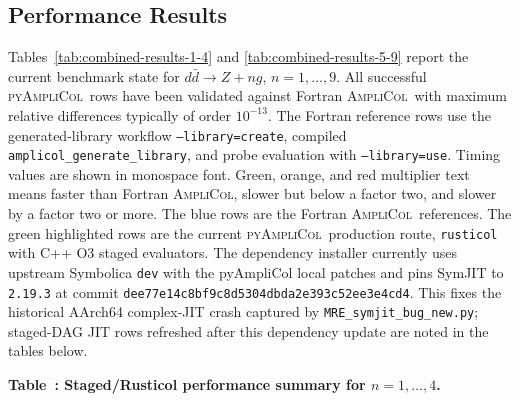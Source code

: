 \documentclass[10pt]{article}
\newcommand{\AC}{\textsc{AmpliCol}}
\newcommand{\PAC}{\textsc{pyAmpliCol}}
\begin{document}
\begin{landscape}
\section{Performance Results}

Tables~\ref{tab:combined-results-1-4} and
\ref{tab:combined-results-5-9}
report the current benchmark state for \(d\bar d\to Z+n g\),
\(n=1,\ldots,9\).  All successful \PAC\ rows have been validated against
Fortran \AC\ with maximum relative differences typically of order \(10^{-13}\).
The Fortran reference rows use the generated-library workflow
\texttt{--library=create}, compiled \texttt{amplicol\_generate\_library}, and
probe evaluation with \texttt{--library=use}.  Timing values are shown in
monospace font.  Green, orange, and red multiplier text means faster than
Fortran \AC, slower but below a factor two, and slower by a factor two or more.
The blue rows are the Fortran \AC\ references.  The green highlighted rows are
the current \PAC\ production route, \texttt{rusticol} with C++ O3 staged
evaluators.
The dependency installer currently uses upstream Symbolica \texttt{dev} with
the pyAmpliCol local patches and pins SymJIT to \texttt{2.19.3} at commit
\texttt{dee77e14c8bf9c8d5304dbda2e393c52ee3e4cd4}.  This fixes the historical
AArch64 complex-JIT crash captured by \texttt{MRE\_symjit\_bug\_new.py};
staged-DAG JIT rows refreshed after this dependency update are noted in the
tables below.

\scriptsize
\setlength{\tabcolsep}{1.55pt}
\renewcommand{\arraystretch}{1.12}
\newcommand{\perfheader}{%
\toprule
\textbf{n} & \textbf{route} & \textbf{setup} & \textbf{gen [s]} & \textbf{wall [us/pt]} & \textbf{eval [us/pt]} & \textbf{notes} \\
\midrule}
\begin{center}
\label{tab:combined-results-1-4}
\textbf{Table~\thetable: Staged/Rusticol performance summary for \(n=1,\ldots,4\).}
\vspace{0.35em}


\end{center}
\end{landscape}
\end{document}
